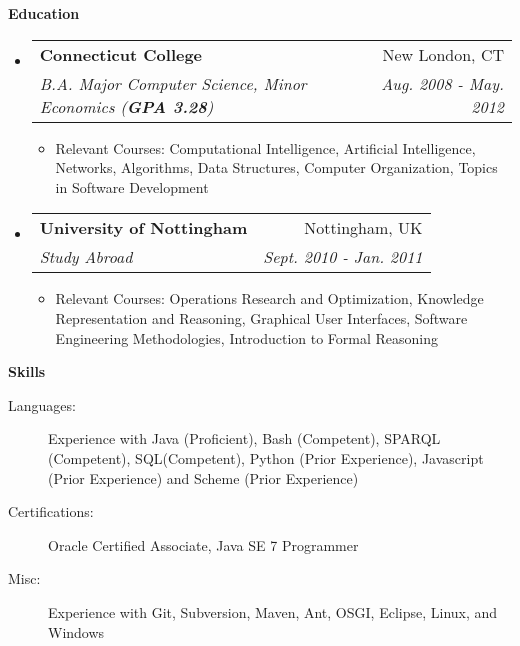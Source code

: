 \documentclass[letterpaper,11pt]{article}
\makeatletter
\newcommand{\resitem}[1]{\item #1 \vspace{-2pt}}
\newcommand{\resheading}[1]{{\large \colorbox{mygrey}{\begin{minipage}{\textwidth}{\textbf{#1 \vphantom{p\^{E}}}}\end{minipage}}}}
\newcommand{\ressubheading}[4]{
\begin{tabular*}{7.0in}{l@{\extracolsep{\fill}}r}
		\textbf{#1} & #2 \\
		\textit{#3} & \textit{#4} \\
\end{tabular*}\vspace{-6pt}}
\makeatother
\begin{document}
\resheading{Education}
\begin{itemize}
	\item
	\ressubheading{Connecticut College}{New London, CT}{B.A. Major Computer Science, Minor Economics (\textbf{GPA 3.28})}{Aug. 2008 - May. 2012}
	\begin{itemize}
		\resitem{Relevant Courses: Computational Intelligence, Artificial Intelligence, Networks, Algorithms, Data Structures, Computer Organization, Topics in Software Development}
	\end{itemize}
	
	\item
	\ressubheading{University of Nottingham}{Nottingham, UK}{Study Abroad}{Sept. 2010 - Jan. 2011}
	\begin{itemize}
		\resitem{Relevant Courses: Operations Research and Optimization, Knowledge Representation and Reasoning, Graphical User Interfaces, Software Engineering Methodologies, Introduction to Formal Reasoning}
	\end{itemize}
\end{itemize}

\resheading{Skills}
\begin{description}
	\item[Languages:]
		Experience with Java (Proficient), Bash (Competent), SPARQL (Competent), SQL(Competent), Python (Prior Experience), Javascript (Prior Experience) and Scheme (Prior Experience)
	\item[Certifications:]
		Oracle Certified Associate, Java SE 7 Programmer
	\item[Misc:]
		Experience with Git, Subversion, Maven, Ant, OSGI, Eclipse, Linux, and Windows
\end{description}
\end{document}
